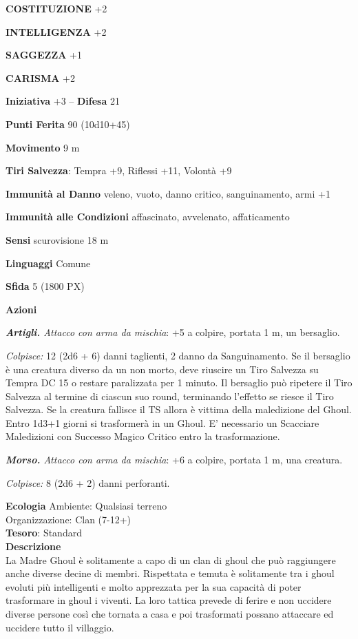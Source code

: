 \begin{multicols}{2}
	\textbf{COSTITUZIONE} +2

	\textbf{INTELLIGENZA} +2

	\textbf{SAGGEZZA} +1

	\textbf{CARISMA} +2

	\textbf{Iniziativa} +3 -- \textbf{Difesa} 21

	\textbf{Punti Ferita} 90 (10d10+45)

	\textbf{Movimento} 9 m

	\textbf{Tiri Salvezza}: Tempra +9, Riflessi +11, Volontà +9

	\textbf{Immunità al Danno} veleno, vuoto, danno critico, sanguinamento, armi +1

	\textbf{Immunità alle Condizioni} affascinato, avvelenato, affaticamento

	\textbf{Sensi} scurovisione 18 m

	\textbf{Linguaggi} Comune

	\textbf{Sfida} 5 (1800 PX)

	\textbf{Azioni}

	\textit{\textbf{Artigli.} Attacco con arma da mischia}: +5 a colpire, portata 1 m, un bersaglio.

	\textit{Colpisce:} 12 (2d6 + 6) danni taglienti, 2 danno da Sanguinamento. Se il bersaglio è una creatura diverso da un non morto, deve riuscire un Tiro Salvezza su Tempra DC 15 o restare paralizzata per 1 minuto. Il bersaglio può ripetere il Tiro Salvezza al termine di ciascun suo round, terminando l'effetto se riesce il Tiro Salvezza. Se la creatura fallisce il TS allora è vittima della maledizione del Ghoul. Entro 1d3+1 giorni si trasformerà in un Ghoul. E' necessario un Scacciare Maledizioni con Successo Magico Critico entro la trasformazione.

	\textit{\textbf{Morso.} Attacco con arma da mischia}: +6 a colpire, portata 1 m, una creatura.

	\textit{Colpisce:} 8 (2d6 + 2) danni perforanti.

	\textbf{Ecologia}
	Ambiente: Qualsiasi terreno\\
	Organizzazione: Clan (7-12+)\\
	\textbf{Tesoro}: Standard\\
	\textbf{Descrizione}\\
	La Madre Ghoul è solitamente a capo di un clan di ghoul che può raggiungere anche diverse decine di membri. Rispettata e temuta è solitamente tra i ghoul evoluti più intelligenti e molto apprezzata per la sua capacità di poter trasformare in ghoul i viventi. La loro tattica prevede di ferire e non uccidere diverse persone così che tornata a casa e poi trasformati possano attaccare ed uccidere tutto il villaggio.



\end{multicols}
